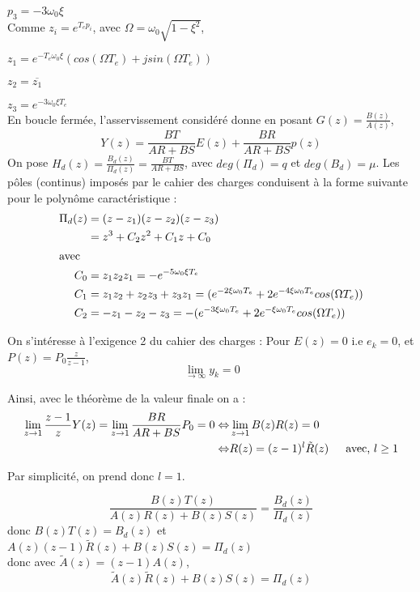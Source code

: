 \documentclass[../main.tex]{subfiles}
\begin{document}
\begin{enumerate}
$p_3 = -3\omega_0 \xi$\\

Comme $z_i = e^{T_ep_i}$, avec $\Omega = \omega_0 \sqrt{1-\xi^2}$,

$z_1 = e^{-T_e\omega_0\xi}(cos(\Omega T_e) +j sin(\Omega T_e))$

$z_2 = \overline{z_1}$

$z_3 = e^{-3\omega_0 \xi T_e}$\\

En boucle fermée, l'asservissement considéré donne en posant $G(z) = \frac{B(z)}{A(z)}$,
\[Y(z) = \frac{BT}{AR+BS}E(z) + \frac{BR}{AR+BS}p(z)\]
On pose $H_d(z) = \frac{B_d(z)}{\Pi_d(z)} = \frac{BT}{AR+BS}$, avec $deg(\Pi_d)=q$ et $deg(B_d)=\mu$. Les pôles (continus) imposés par le cahier des charges conduisent à la forme suivante pour le polynôme caractéristique :
\begin{align*}
\Pi_d(z) &= (z-z_1)(z-z_2)(z-z_3)\\
&= z^3+C_2z^2+C_1z+C_0\\
\intertext{avec}
C_0 &= z_1z_2z_1 = -e^{-5\omega_0 \xi T_e}\\
C_1 &= z_1z_2 + z_2z_3 + z_3z_1 = (e^{-2 \xi \omega_0 T_e}+2e^{-4\xi \omega_0 T_e}cos(\Omega T_e))\\
C_2 &= -z_1-z_2-z_3 = -(e^{-3\xi \omega_0 T_e}+2e^{-\xi \omega_0 T_e}cos(\Omega T_e))\\
\end{align*}



On s'intéresse à l'exigence 2 du cahier des charges :
Pour $E(z) = 0$ i.e $e_k = 0$, et $P(z) = P_0 \frac{z}{z-1}$,
\[\lim_{\rightarrow\infty} y_k =0\]

Ainsi, avec le théorème de la valeur finale on a :
\begin{align*}
\lim_{z\rightarrow 1} \frac{z-1}{z}Y(z) = \lim_{z\rightarrow 1} \frac{BR}{AR+BS}P_0 =0
\Leftrightarrow & \lim_{z\rightarrow 1} B(z)R(z) = 0\\
\Leftrightarrow & R(z) = (z-1)^l \tilde{R}(z)\text{\indent avec, } l\geq 1\\
\end{align*}

Par simplicité, on prend donc $l=1$.

\[\frac{B(z)T(z)}{A(z)R(z)+B(z)S(z)} = \frac{B_d(z)}{\Pi_d(z)}\]
donc $B(z)T(z) = B_d(z)$ et $A(z)(z-1)\tilde{R}(z)+B(z)S(z)=\Pi_d(z)$\\
donc avec $\tilde{A}(z) = (z-1)A(z)$, \[\boxed{\tilde{A}(z)\tilde{R}(z) + B(z)S(z) = \Pi_d(z)}\]



\end{enumerate}
\end{document}
